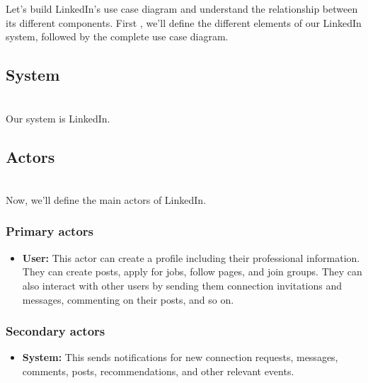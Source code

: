 

Let's build LinkedIn's use case diagram and understand the relationship between its different components. First , we'll define the different elements of our LinkedIn system, followed by the complete use case diagram.

\subsection{System}\label{DklM0cQ5mKO9iJUQZ3MRx}
\\
Our system is LinkedIn.

\subsection{Actors}\label{oSnFTfwG3rrOCuv6Nrpfo}
\\
Now, we'll define the main actors of LinkedIn.

\subsubsection{Primary actors}\label{n1JHUfylCqtYzkCQHBbON}

\begin{itemize}
\item
\protect{}\label{5RFkZE-ZCJAZnkj4FrXZB}
\textbf{User:} This actor can create a profile including their professional information. They can create posts, apply for jobs, follow pages, and join groups. They can also interact with other users by sending them connection invitations and messages, commenting on their posts, and so on.
\end{itemize}

\subsubsection{Secondary actors}\label{a1O8t-Eqp74zP-yCsssww}

\begin{itemize}
\item
\protect{}\label{i_AuWU5YGd5aXqfGPWzdB}
\textbf{System:} This sends notifications for new connection requests, messages, comments, posts, recommendations, and other relevant events.
\end{itemize}

